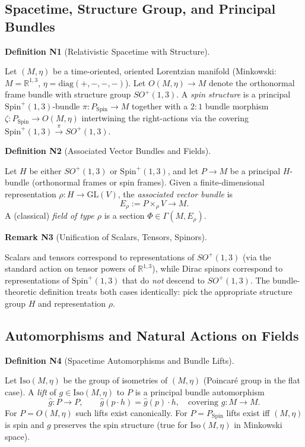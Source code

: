\documentclass[10pt, letterpaper]{article}
\newcommand{\R}{\mathbb{R}}
\newcommand{\GL}{\mathrm{GL}}
\newcommand{\Spin}{\mathrm{Spin}}
\newcommand{\CustomHeading}[3]{%
  \par\medskip\noindent%
  \textbf{#1 #2} \textnormal{(#3)}.\enskip%
}
\newenvironment{DEF}[2]{\begin{unitbox}\CustomHeading{Definition}{#1}{#2}}{\end{unitbox}}
\newenvironment{REM}[2]{\begin{unitbox}\CustomHeading{Remark}{#1}{#2}}{\end{unitbox}}
\begin{document}
\subsection{Spacetime, Structure Group, and Principal Bundles}

\begin{DEF}{N1}{Relativistic Spacetime with Structure}
Let $(M,\eta)$ be a time-oriented, oriented Lorentzian manifold (Minkowski: $M=\R^{1,3}$, $\eta=\mathrm{diag}(+,-,-,-)$).  
Let $O(M,\eta)\to M$ denote the orthonormal frame bundle with structure group $SO^+(1,3)$.  
A \emph{spin structure} is a principal $\Spin^+(1,3)$-bundle $\pi:P_{\Spin}\to M$ together with a $2\!:\!1$ bundle morphism $\zeta:P_{\Spin}\to O(M,\eta)$ intertwining the right-actions via the covering $\Spin^+(1,3)\xrightarrow{\ \pi\ }SO^+(1,3)$.
\end{DEF}

\begin{DEF}{N2}{Associated Vector Bundles and Fields}
Let $H$ be either $SO^+(1,3)$ or $\Spin^+(1,3)$, and let $P\to M$ be a principal $H$-bundle (orthonormal frames or spin frames).  
Given a finite-dimensional representation $\rho:H\to \GL(V)$, the \emph{associated vector bundle} is
\[
E_\rho := P\times_\rho V \longrightarrow M.
\]
A (classical) \emph{field of type $\rho$} is a section $\Phi\in\Gamma(M,E_\rho)$.
\end{DEF}

\begin{REM}{N3}{Unification of Scalars, Tensors, Spinors}
Scalars and tensors correspond to representations of $SO^+(1,3)$ (via the standard action on tensor powers of $\R^{1,3}$), while Dirac spinors correspond to representations of $\Spin^+(1,3)$ that do \emph{not} descend to $SO^+(1,3)$.  
The bundle-theoretic definition treats both cases identically: pick the appropriate structure group $H$ and representation $\rho$.
\end{REM}

\subsection{Automorphisms and Natural Actions on Fields}

\begin{DEF}{N4}{Spacetime Automorphisms and Bundle Lifts}
Let $\mathrm{Iso}(M,\eta)$ be the group of isometries of $(M,\eta)$ (Poincaré group in the flat case).  
A \emph{lift} of $g\in \mathrm{Iso}(M,\eta)$ to $P$ is a principal bundle automorphism
\[
\widehat g:P\to P,\qquad \widehat g(p\cdot h)=\widehat g(p)\cdot h,\quad \text{covering } g:M\to M.
\]
For $P=O(M,\eta)$ such lifts exist canonically.  
For $P=P_{\Spin}$ lifts exist iff $(M,\eta)$ is spin and $g$ preserves the spin structure (true for $\mathrm{Iso}(M,\eta)$ in Minkowski space).
\end{DEF}
\end{document}
